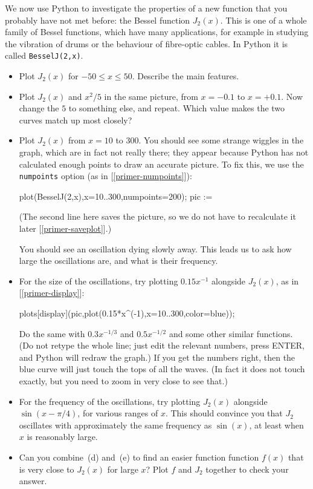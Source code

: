 \documentclass[a4paper,10pt]{amsbook}
\begin{document}
\begin{exercise}\label{ex-bessel}
 We now use Python to investigate the properties of a new function that
 you probably have not met before: the Bessel function $J_2(x)$.  This
 is one of a whole family of Bessel functions, which have many
 applications, for example in studying the vibration of drums or the
 behaviour of fibre-optic cables.  In Python it is called
 \verb~BesselJ(2,x)~. 
 \begin{itemize}
  \item[(a)] Plot $J_2(x)$ for $-50\leq x\leq 50$.  Describe the
   main features. 
  \item[(b)] Plot $J_2(x)$ and $x^2/5$ in the same picture, from $x=-0.1$
   to $x=+0.1$.  Now change the $5$ to something else, and repeat. 
   Which value makes the two curves match up most closely? 
  \item[(c)] Plot $J_2(x)$ from $x=10$ to $300$.  You should see some
   strange wiggles in the graph, which are in fact not really there;
   they appear because Python has not calculated enough points to draw
   an accurate picture.  To fix this, we use the \verb~numpoints~
   option (as in [\ref{primer-numpoints}]):
\begin{pcodeblock}
  plot(BesselJ(2,x),x=10..300,numpoints=200);
  pic := %
\end{pcodeblock}
   (The second line here saves the picture, so we do not have to
   recalculate it later [\ref{primer-saveplot}].) 

   You should see an oscillation dying slowly away.  This leads us to
   ask how large the oscillations are, and what is their frequency. 
  \item[(d)] For the size of the oscillations, try plotting $0.15x^{-1}$
   alongside $J_2(x)$, as in [\ref{primer-display}]:
\begin{pcodeblock}
  plots[display](pic,plot(0.15*x^(-1),x=10..300,color=blue));
\end{pcodeblock}
   Do the same with $0.3x^{-1/3}$ and $0.5x^{-1/2}$ and some other
   similar functions.  (Do not retype the whole line; just edit the
   relevant numbers, press ENTER, and Python will redraw the graph.) 
   If you get the numbers right, then the blue curve will just touch
   the tops of all the waves.  (In fact it does not touch exactly, but
   you need to zoom in very close to see that.) 
  \item[(e)] For the frequency of the oscillations, try plotting
   $J_2(x)$ alongside $\sin(x-\pi/4)$, for various ranges of $x$. 
   This should convince you that $J_2$ oscillates with approximately
   the same frequency as $\sin(x)$, at least when $x$ is reasonably
   large. 
  \item[(f)] Can you combine~(d) and~(e) to find an easier function
   function $f(x)$ that is very close to $J_2(x)$ for large $x$?  Plot
   $f$ and $J_2$ together to check your answer. 
 \end{itemize}
\end{exercise}
\end{document}
